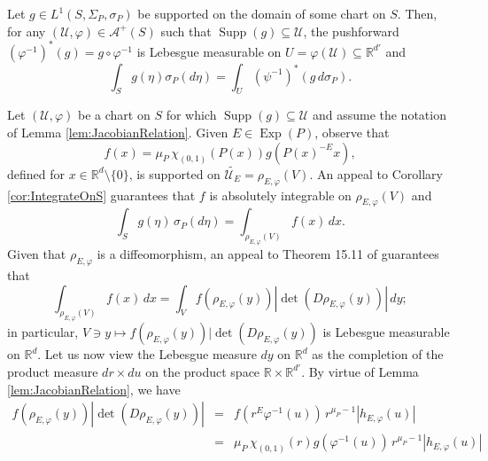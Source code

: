 \documentclass[smallextended]{svjour3}
\theoremstyle{remark}
\renewenvironment{proof}[1][\proofname]{\renewcommand\xproofname{#1}\xproof}{\endxproof}
\newcommand\Exp{\operatorname{Exp}}
\newcommand\supp{\operatorname{Supp}}
\renewcommand\det{\operatorname{det}}
\begin{document}
\begin{lemma}\label{lem:LocalIntegralFormula}
Let $g\in L^1(S,\Sigma_P,\sigma_P)$ be supported on the domain of some chart on $S$. Then, for any $(\mathcal{U},\varphi)\in\mathcal{A}^+(S)$ such that $\supp(g)\subseteq\mathcal{U}$, the pushforward $(\varphi^{-1})^*(g)=g\circ\varphi^{-1}$ is Lebesgue measurable on $U=\varphi(\mathcal{U})\subseteq\mathbb{R}^{d'}$ and 
\begin{equation*}
\int_S g(\eta)\sigma_P(d\eta)=\int_{U}(\psi^{-1})^*(g\, d\sigma_P).
\end{equation*}
\end{lemma}
\begin{proof}
Let $(\mathcal{U},\varphi)$ be a chart on $S$ for which $\supp(g)\subseteq \mathcal{U}$ and assume the notation of Lemma \ref{lem:JacobianRelation}. Given $E\in\Exp(P)$, observe that
\begin{equation*}
    f(x)=\mu_P\, \chi_{(0,1)}(P(x))g(P(x)^{-E}x),
\end{equation*}
defined for $x\in\mathbb{R}^d\setminus\{0\}$, is supported on $\widetilde{\mathcal{U}_E}=\rho_{E,\varphi}(V)$. An appeal to Corollary \ref{cor:IntegrateOnS} guarantees that $f$ is absolutely integrable on $\rho_{E,\varphi}(V)$ and
\begin{equation}\label{eq:LocalIntegralFormula1}
\int_S g(\eta)\,\sigma_P(d\eta)=\int_{\rho_{E,\varphi}(V)}f(x)\,dx.
\end{equation}
Given that $\rho_{E,\varphi}$ is a diffeomorphism, an appeal to Theorem 15.11 of \cite{apostol_mathematical_1974} guarantees that
\begin{equation}\label{eq:LocalIntegralFormula2}
\int_{\rho_{E,\varphi}(V)}f(x)\,dx=\int_V f(\rho_{E,\varphi}(y))|\det(D\rho_{E,\varphi}(y))|\,dy;
\end{equation}
in particular, $V\ni y\mapsto f(\rho_{E,\varphi}(y))|\det(D\rho_{E,\varphi}(y))$ is Lebesgue measurable on $\mathbb{R}^{d}$. Let us now view the Lebesgue measure $dy$ on $\mathbb{R}^d$ as the completion of the product measure $dr\times du$ on the product space $\mathbb{R}\times\mathbb{R}^{d'}$. By virtue of Lemma \ref{lem:JacobianRelation}, we have
\begin{eqnarray}\label{eq:LocalIntegralFormula3}\nonumber
    f(\rho_{E,\varphi}(y))|\det(D\rho_{E,\varphi}(y))|
    &=& f(r^E\varphi^{-1}(u))\,r^{\mu_{P}-1}|h_{E,\varphi}(u)|\\ \nonumber
    &=& \mu_P\,\chi_{(0,1)}(r)g(\varphi^{-1}(u))\, r^{\mu_P-1}|h_{E,\varphi}(u)|\\ 

\end{eqnarray}
\end{proof}
\end{document}
